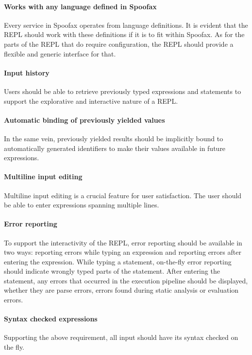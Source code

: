 \paragraph{Works with any language defined in Spoofax} Every service
in Spoofax operates from language definitions. It is evident that the
REPL should work with these definitions if it is to fit within
Spoofax. As for the parts of the REPL that do require configuration,
the REPL should provide a flexible and generic interface for that.

\paragraph{Input history} Users should be able to retrieve previously
typed expressions and statements to support the explorative and interactive
nature of a REPL.

\paragraph{Automatic binding of previously yielded values} In the same vein,
previously yielded results should be implicitly bound to automatically generated
identifiers to make their values available in future expressions.

\paragraph{Multiline input editing} Multiline input editing is a
crucial feature for user satisfaction. The user should be able to
enter expressions spanning multiple lines.

\paragraph{Error reporting} To support the interactivity of the REPL,
error reporting should be available in two ways: reporting errors
while typing an expression and reporting errors after entering the
expression. While typing a statement, on-the-fly error reporting
should indicate wrongly typed parts of the statement. After entering
the statement, any errors that occurred in the execution pipeline
should be displayed, whether they are parse errors, errors found
during static analysis or evaluation errors.

\paragraph{Syntax checked expressions} Supporting the above requirement, all
input should have its syntax checked on the fly.

